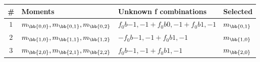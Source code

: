 \begin{table}[!h]
\centering
\begin{tabular}{c l l l}
\toprule
\# & Moments & Unknown f combinations & Selected\\
\midrule
\multirow{ 1}{*}{$1$} & \multirow{ 1}{*}{$m_\bb{0,0}, m_\bb{0,1}, m_\bb{0,2}$} & $f_0b{-1,-1}+f_0b{0,-1}+f_0b{1,-1}$ & \multirow{ 1}{*}{$m_\bb{0,1}$}\\ 
\midrule
\multirow{ 1}{*}{$2$} & \multirow{ 1}{*}{$m_\bb{1,0}, m_\bb{1,1}, m_\bb{1,2}$} & $-f_0b{-1,-1}+f_0b{1,-1}$ & \multirow{ 1}{*}{$m_\bb{1,0}$}\\ 
\midrule
\multirow{ 1}{*}{$3$} & \multirow{ 1}{*}{$m_\bb{2,0}, m_\bb{2,1}, m_\bb{2,2}$} & $f_0b{-1,-1}+f_0b{1,-1}$ & \multirow{ 1}{*}{$m_\bb{2,0}$}\\ 
\bottomrule
\end{tabular}\end{table}
